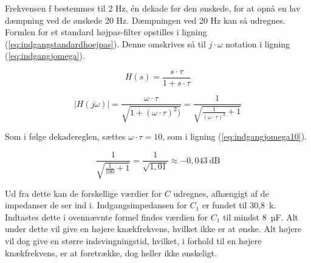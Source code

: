 Frekvensen f bestemmes til 2 Hz, én dekade før den ønskede, for at opnå en lav dæmpning ved de ønskede 20 Hz. Dæmpningen ved 20 Hz kan så udregnes. Formlen for et standard højpas-filter opstilles i ligning (\ref{eq:indgangstandardhoejpas}). Denne omskrives så til $j\cdot\omega$ notation i ligning (\ref{eq:indgangjomega}).

\begin{equation}
\label{eq:indgangstandardhoejpas}
H(s)=\frac{s\cdot\tau}{1+s\cdot\tau}
\end{equation}

\begin{equation}
\label{eq:indgangjomega}
|H(j\omega)|=\frac{\omega\cdot\tau}{\sqrt{1+(\omega\cdot\tau)^2)}}=\frac{1}{\sqrt{\frac{1}{(\omega\cdot\tau)^2}+1}}
\end{equation}

Som i følge dekadereglen, sættes $\omega\cdot\tau = 10$, som i ligning (\ref{eq:indgangjomega10}).

\begin{equation}
\label{eq:indgangjomega10}
\frac{1}{\sqrt{\frac{1}{100}+1}}=\frac{1}{\sqrt{1,01}}\approx -0,043~\mathrm{dB}
\end{equation}

Ud fra dette kan de forskellige værdier for $C$ udregnes, afhængigt af de impedanser de ser ind i.
Indgangsimpedansen for $C_1$ er fundet til 30,8~k\ohm . Indtastes dette i ovennævnte formel findes værdien for $C_1$ til mindst 8~µF. Alt under dette vil give en højere knækfrekvens, hvilket ikke er at ønske. Alt højere vil dog give en større indsvingningstid, hvilket, i forhold til en højere knækfrekvens, er at foretrække, dog heller ikke ønskeligt.


